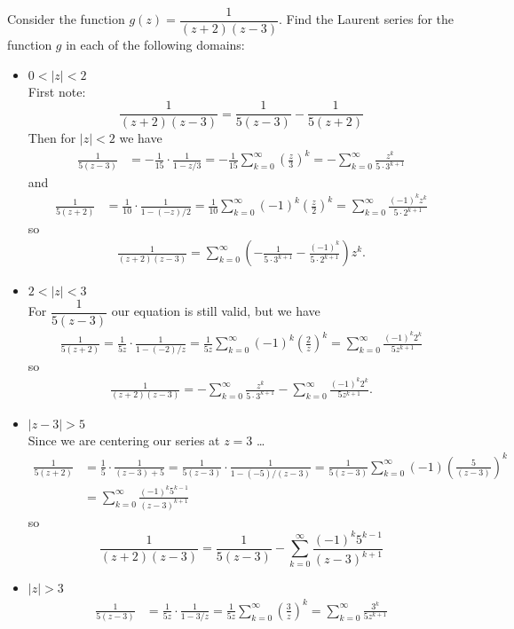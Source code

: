 \documentclass[12pt]{article}
\newenvironment{problem}[2][Problem]{\begin{trivlist}
\item[\hskip \labelsep {\bfseries #1} \hskip \labelsep {\bfseries #2.}]}{\end{trivlist}}
\begin{document}
\begin{problem}{4}
	Consider the function $g(z) = \dfrac{1}{(z+2)(z-3)}$. Find the Laurent series for the function $g$ in each of the following domains:
	\begin{itemize}
		\item[(a)] $0 < |z| < 2$ \\
			First note:
			\[
				\frac{1}{(z + 2)(z - 3)} = \frac{1}{5(z - 3)}-\frac{1}{5(z + 2)} 
			\]
			Then for $|z| < 2$ we have
			\begin{align*}
				\frac{1}{5(z - 3)} &= -\frac{1}{15}\cdot\frac{1}{1 - z/3} = -\frac{1}{15}\sum_{k=0}^{\infty} \left(\frac{z}{3}\right)^k = -\sum_{k=0}^{\infty} \frac{z^k}{5\cdot 3^{k+1}}
			\end{align*}
			and
			\begin{align*}
				\frac{1}{5(z + 2)} &= \frac{1}{10}\cdot\frac{1}{1 - (-z)/2} = \frac{1}{10}\sum_{k=0}^{\infty} (-1)^k\left(\frac{z}{2}\right)^k = \sum_{k=0}^{\infty} \frac{(-1)^kz^k}{5\cdot2^{k+1}}
			\end{align*}
			so
			\begin{align*}
				\frac{1}{(z+2)(z-3)} = \sum_{k=0}^{\infty} \left(-\frac{1}{5\cdot3^{k+1}} - \frac{(-1)^k}{5\cdot2^{k+1}}\right)z^k.
			\end{align*}
		\item[(b)] $2 < |z| < 3$ \\
			For $\dfrac{1}{5(z - 3)}$ our equation is still valid, but we have
			\begin{align*}
				\frac{1}{5(z+2)} = \frac{1}{5z}\cdot\frac{1}{1 - (-2)/z} = \frac{1}{5z}\sum_{k=0}^{\infty} (-1)^k\left(\frac{2}{z}\right)^k = \sum_{k=0}^{\infty} \frac{(-1)^k2^k}{5z^{k+1}} 
			\end{align*}
			so
			\begin{align*}
				\frac{1}{(z+2)(z-3)} = -\sum_{k=0}^{\infty} \frac{z^k}{5\cdot3^{k+1}} - \sum_{k=0}^{\infty} \frac{(-1)^k2^k}{5z^{k+1}}.
			\end{align*}
		\item[(c)] $|z - 3| > 5$ \\
			Since we are centering our series at $z = 3$ \ldots
			\begin{align*}
				\frac{1}{5(z+2)} &= \frac{1}{5}\cdot\frac{1}{(z - 3) + 5} = \frac{1}{5(z - 3)} \cdot \frac{1}{1 - (-5)/(z - 3)} = \frac{1}{5(z - 3)}\sum_{k=0}^{\infty} (-1)\left(\frac{5}{(z - 3)}\right)^k \\
						 &= \sum_{k=0}^{\infty} \frac{(-1)^k5^{k-1}}{(z - 3)^{k + 1}}
			\end{align*}
			so
	\[
		\frac{1}{(z +2)(z-3)} = \frac{1}{5(z - 3)} - \sum_{k=0}^{\infty} \frac{(-1)^k5^{k-1}}{(z - 3)^{k+1}}
	\]
		\item[(d)]
			$|z| > 3$
			\begin{align*}
				\frac{1}{5(z-3)} &= \frac{1}{5z} \cdot \frac{1}{1 - 3/z} = \frac{1}{5z}\sum_{k=0}^{\infty} \left(\frac{3}{z}\right)^k = \sum_{k=0}^{\infty} \frac{3^k}{5z^{k+1}}
			\end{align*}
	\end{itemize}

\end{problem}
\end{document}
